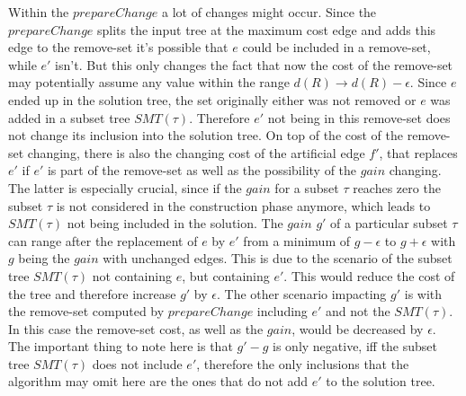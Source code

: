 Within the $prepareChange$ a lot of changes might occur. Since the $prepareChange$ splits the input tree at the maximum cost edge and adds this edge to the remove-set it's possible that $e$ could be included in a remove-set, while $e'$ isn't. But this only changes the fact that now the cost of the remove-set may potentially assume any value within the range $d(R) \to d(R)-\epsilon$. Since $e$ ended up in the solution tree, the set originally either was not removed or $e$ was added in a subset tree $SMT(\tau)$. Therefore $e'$ not being in this remove-set does not change its inclusion into the solution tree. On top of the cost of the remove-set changing, there is also the changing cost of the artificial edge $f'$, that replaces $e'$ if $e'$ is part of the remove-set as well as the possibility of the $gain$ changing. The latter is especially crucial, since if the $gain$ for a subset $\tau$ reaches zero the subset $\tau$ is not considered in the construction phase anymore, which leads to $SMT(\tau)$ not being included in the solution. The $gain$ $g'$ of a particular subset $\tau$ can range after the replacement of $e$ by $e'$ from a minimum of $g-\epsilon$ to $g+\epsilon$ with $g$ being the $gain$ with unchanged edges. This is due to the scenario of the subset tree $SMT(\tau)$ not containing $e$, but containing $e'$. This would reduce the cost of the tree and therefore increase $g'$ by $\epsilon$. The other scenario impacting $g'$ is with the remove-set computed by $prepareChange$ including $e'$ and not the $SMT(\tau)$. In this case the remove-set cost, as well as the $gain$, would be decreased by $\epsilon$. The important thing to note here is that $g'-g$ is only negative, iff the subset tree $SMT(\tau)$ does not include $e'$, therefore the only inclusions that the algorithm may omit here are the ones that do not add $e'$ to the solution tree.  

